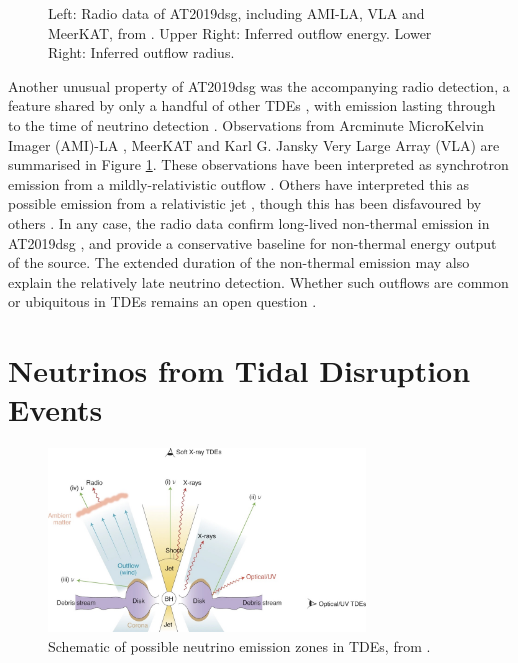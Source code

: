 \documentclass[a4paper,11pt]{article}
\begin{document}
\begin{figure}
\begin{subfigure}{0.40\textwidth}
	\end{subfigure}
	\caption{Left: Radio data of AT2019dsg, including AMI-LA, VLA and MeerKAT, from \cite{bran}. Upper Right: Inferred outflow energy. Lower Right: Inferred outflow radius.}
	\label{fig:bran_radio}
\end{figure}

Another unusual property of AT2019dsg was the accompanying radio detection, a feature shared by only a handful of other TDEs \cite{radio_tde_summary}, with emission lasting through to the time of neutrino detection \cite{bran}. Observations from Arcminute MicroKelvin Imager (AMI)-LA \cite{ami_08, ami_18}, MeerKAT \cite{meerkat_16} and Karl G. Jansky Very Large Array (VLA) \cite{vla_80} are summarised in Figure \ref{fig:bran_radio}. These observations have been interpreted as synchrotron emission from a mildly-relativistic outflow \cite{bran, cendes_21, mohan_21, matsumoto_21}. Others have interpreted this as possible emission from a relativistic jet \cite{liu21_bran, winter_bran_21}, though this has been disfavoured by others \cite{mohan_21, cendes_21}. In any case, the radio data confirm long-lived non-thermal emission in AT2019dsg \cite{bran}, and provide a conservative baseline for non-thermal energy output of the source. The extended duration of the non-thermal emission may also explain the relatively late neutrino detection. Whether such outflows are common or ubiquitous in TDEs remains an open question \cite{radio_tde_summary}. 

\section{Neutrinos from Tidal Disruption Events}

\begin{figure}[!ht]
	\centering
	\includegraphics[width=0.75\textwidth]{figures/tde_nu}
	\caption{Schematic of possible neutrino emission zones in TDEs, from \cite{hayasaki_21}.}
	\label{fig:tde_nu}
\end{figure}
\end{document}
